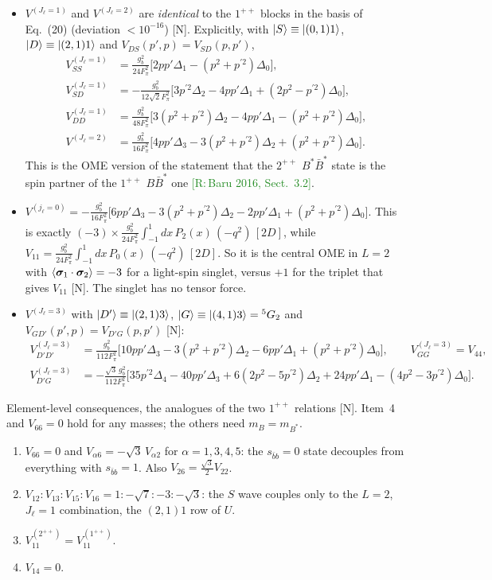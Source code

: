 \documentclass[11pt,a4paper]{article}
\newcommand{\tagR}[1]{\textcolor{ForestGreen}{\textsf{\small[R:\,#1]}}}
\newcommand{\tagN}{\textcolor{red!70!black}{\textsf{\small[N]}}}
\newcommand{\BBst}{B\bar B^*}
\newcommand{\BstBst}{B^*\bar B^*}
\begin{document}
\begin{itemize}
\item $V^{(J_\ell=1)}$ and $V^{(J_\ell=2)}$ are \emph{identical} to the $1^{++}$ blocks in the basis of Eq.~(20) (deviation $<10^{-16}$) \tagN. Explicitly, with $\ket{S}\equiv\ket{(0,1)1}$, $\ket{D}\equiv\ket{(2,1)1}$ and $V_{DS}(p',p)=V_{SD}(p,p')$,
\begin{align*}
V^{(J_\ell=1)}_{SS}&=\frac{g_b^2}{24F_\pi^2}\Big[2pp'\Delta_1-(p^2+p^{\prime2})\Delta_0\Big],\\
V^{(J_\ell=1)}_{SD}&=-\frac{g_b^2}{12\sqrt2F_\pi^2}\Big[3p^{\prime2}\Delta_2-4pp'\Delta_1+(2p^2-p^{\prime2})\Delta_0\Big],\\
V^{(J_\ell=1)}_{DD}&=\frac{g_b^2}{48F_\pi^2}\Big[3(p^2+p^{\prime2})\Delta_2-4pp'\Delta_1-(p^2+p^{\prime2})\Delta_0\Big],\\
V^{(J_\ell=2)}&=\frac{g_b^2}{16F_\pi^2}\Big[4pp'\Delta_3-3(p^2+p^{\prime2})\Delta_2+(p^2+p^{\prime2})\Delta_0\Big].
\end{align*}
This is the OME version of the statement that the $2^{++}$ $\BstBst$ state is the spin partner of the $1^{++}$ $\BBst$ one \tagR{Baru 2016, Sect.~3.2}.
\item $V^{(j_\ell=0)}=-\frac{g_b^2}{16F_\pi^2}\big[6pp'\Delta_3-3(p^2+p^{\prime2})\Delta_2-2pp'\Delta_1+(p^2+p^{\prime2})\Delta_0\big]$. This is exactly $(-3)\times\frac{g_b^2}{24F_\pi^2}\int_{-1}^1\!dx\,P_2(x)\,(-q^2)\,[2D]$, while $V_{11}=\frac{g_b^2}{24F_\pi^2}\int_{-1}^1\!dx\,P_0(x)\,(-q^2)\,[2D]$. So it is the central OME in $L=2$ with $\braket{\bm\sigma_1\cdot\bm\sigma_2}=-3$ for a light-spin singlet, versus $+1$ for the triplet that gives $V_{11}$ \tagN. The singlet has no tensor force.
\item $V^{(J_\ell=3)}$ with $\ket{D'}\equiv\ket{(2,1)3}$, $\ket{G}\equiv\ket{(4,1)3}={}^5G_2$ and $V_{GD'}(p',p)=V_{D'G}(p,p')$ \tagN:
\begin{align*}
V^{(J_\ell=3)}_{D'D'}&=\frac{g_b^2}{112F_\pi^2}\Big[10pp'\Delta_3-3(p^2+p^{\prime2})\Delta_2-6pp'\Delta_1+(p^2+p^{\prime2})\Delta_0\Big],\qquad V^{(J_\ell=3)}_{GG}=V_{44},\\
V^{(J_\ell=3)}_{D'G}&=-\frac{\sqrt3\,g_b^2}{112F_\pi^2}\Big[35p^{\prime2}\Delta_4-40pp'\Delta_3+6(2p^2-5p^{\prime2})\Delta_2+24pp'\Delta_1-(4p^2-3p^{\prime2})\Delta_0\Big].
\end{align*}
\end{itemize}
Element-level consequences, the analogues of the two $1^{++}$ relations \tagN. Item~4 and $V_{66}=0$ hold for any masses; the others need $m_B=m_{B^*}$.
\begin{enumerate}
\item $V_{66}=0$ and $V_{\alpha6}=-\sqrt3\,V_{\alpha2}$ for $\alpha=1,3,4,5$: the $s_{\bar bb}=0$ state decouples from everything with $s_{\bar bb}=1$. Also $V_{26}=\frac{\sqrt3}{2}V_{22}$.
\item $V_{12}:V_{13}:V_{15}:V_{16}=1:-\sqrt7:-3:-\sqrt3$: the $S$ wave couples only to the $L=2$, $J_\ell=1$ combination, the $(2,1)1$ row of $U$.
\item $V_{11}^{(2^{++})}=V_{11}^{(1^{++})}$.
\item $V_{14}=0$.
\end{enumerate}
\end{document}
